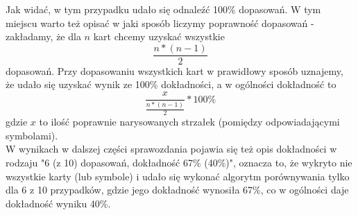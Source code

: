 \documentclass[10pt,a4paper]{article}
\begin{document}
Jak widać, w tym przypadku udało się odnaleźć 100\% dopasowań. W tym miejscu warto też opisać w jaki sposób liczymy poprawność dopasowań - zakładamy, że dla $n$ kart chcemy uzyskać wszystkie $$\frac{n*(n-1)}{2}$$ dopasowań. Przy dopasowaniu wszystkich kart w prawidłowy sposób uznajemy, że udało się uzyskać wynik ze 100\% dokładności, a w ogólności dokładność to 
$$\frac{x}{\frac{n*(n-1)}{2}} * 100\% $$ gdzie $x$ to ilość poprawnie narysowanych strzałek (pomiędzy odpowiadającymi symbolami).\\

W wynikach w dalszej części sprawozdania pojawia się też opis dokładności w rodzaju "6 (z 10) dopasowań, dokładność 67\% (40\%)", oznacza to, że wykryto nie wszystkie karty (lub symbole) i udało się wykonać algorytm porównywania tylko dla 6 z 10 przypadków, gdzie jego dokładność wynosiła 67\%, co w ogólności daje dokładność wyniku 40\%.
\newpage
\end{document}
